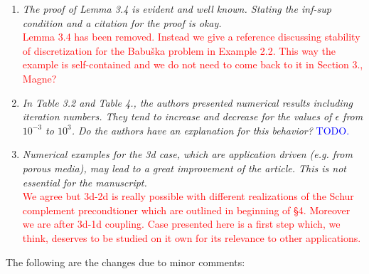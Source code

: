 \documentclass[10pt, a4paper]{article}
\begin{document}
\begin{enumerate}
{}
  \item{\textit{The proof of Lemma 3.4 is evident and well known. Stating the
    inf-sup condition and a citation for the proof is okay.}\\
    \textcolor{red}{Lemma 3.4 has been removed. Instead we give a reference
    discussing stability of discretization for the Babu\v{s}ka problem in
    Example 2.2. This way the example is self-contained and we do not need to
    come back to it in Section 3., Magne?
    }
}
  \item{\textit{In Table 3.2 and Table 4., the authors presented numerical
    results including iteration numbers. They tend to increase and decrease for
    the values of $\epsilon$ from $10^{-3}$ to $10^{3}$. Do the authors have an
    explanation for this behavior?}
    \textcolor{blue}{TODO.}
}
  \item{\textit{Numerical examples for the 3d case, which are application driven
    (e.g. from porous media), may lead to a great improvement of the article.
    This is not essential for the manuscript.}\\
    \textcolor{red}{We agree but 3d-2d is really possible with different realizations of the
    Schur complement precondtioner which are outlined in beginning of \S 4.
    Moreover we are after 3d-1d coupling. Case presented here is a first step
    which, we think, deserves to be studied on it own for its relevance to other
    applications.}
}
\end{enumerate}

The following are the changes due to minor comments:
\end{document}
